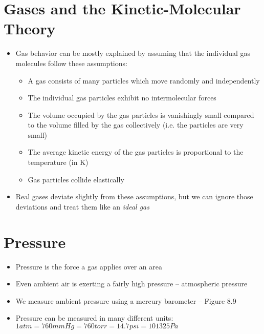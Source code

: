 \documentclass[12pt, openany, letterpaper]{memoir}
\begin{document}
\section{Gases and the Kinetic-Molecular Theory}
\begin{itemize}
	\item Gas behavior can be mostly explained by assuming that the individual gas molecules follow these assumptions:
	      \begin{itemize}
		      \item A gas consists of many particles which move randomly and independently
		      \item The individual gas particles exhibit no intermolecular forces
		      \item The volume occupied by the gas particles is vanishingly small compared to the volume filled by the gas collectively (i.e. the particles are very small)
		      \item The average kinetic energy of the gas particles is proportional to the temperature (in K)
		      \item Gas particles collide elastically
	      \end{itemize}
	\item Real gases deviate slightly from these assumptions, but we can ignore those deviations and treat them like an \emph{ideal gas}
\end{itemize}

\section{Pressure}
\begin{itemize}
	\item Pressure is the force a gas applies over an area
	\item Even ambient air is exerting a fairly high pressure -- atmospheric pressure
	\item We measure ambient pressure using a mercury barometer -- Figure 8.9
	\item Pressure can be measured in many different units: $1atm=760mmHg=760torr=14.7psi=101325Pa$
\end{itemize}
\end{document}
